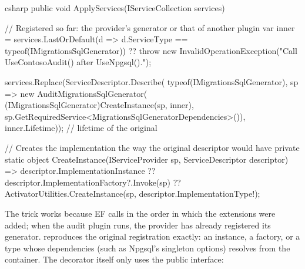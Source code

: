 \begin{sourcecode}{csharp}
public void ApplyServices(IServiceCollection services)
{
    // Registered so far: the provider's generator or that of another plugin
    var inner = services.LastOrDefault(d => d.ServiceType == typeof(IMigrationsSqlGenerator))
        ?? throw new InvalidOperationException("Call UseContosoAudit() after UseNpgsql().");

    services.Replace(ServiceDescriptor.Describe(
        typeof(IMigrationsSqlGenerator),
        sp => new AuditMigrationsSqlGenerator(
            (IMigrationsSqlGenerator)CreateInstance(sp, inner),
            sp.GetRequiredService<MigrationsSqlGeneratorDependencies>()),
        inner.Lifetime));     // lifetime of the original
}

// Creates the implementation the way the original descriptor would have
private static object CreateInstance(IServiceProvider sp, ServiceDescriptor descriptor)
    => descriptor.ImplementationInstance
       ?? descriptor.ImplementationFactory?.Invoke(sp)
       ?? ActivatorUtilities.CreateInstance(sp, descriptor.ImplementationType!);
\end{sourcecode}

The trick works because EF calls  in the order in which the
extensions were added; when the audit plugin runs, the provider has already registered its
generator.  reproduces the original registration exactly:
an instance, a factory, or a type whose dependencies (such as Npgsql's singleton options)
 resolves from the container. The decorator itself
only uses the public interface:


